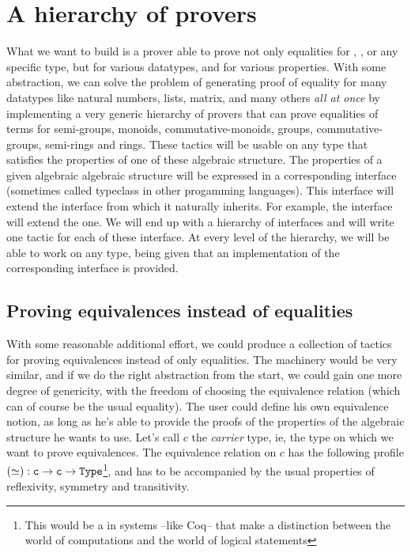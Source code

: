 \section{A hierarchy of provers}

What we want to build is a prover able to prove not only equalities for , , or any specific type, but for various datatypes, and for various properties. With some abstraction, we can solve the problem of generating proof of equality for many datatypes like natural numbers, lists, matrix, and many others \emph{all at once} by implementing a very generic hierarchy of provers that can prove equalities of terms for semi-groups, monoids, commutative-monoids, groups, commutative-groups, semi-rings and rings. These tactics will be usable on any type that satisfies the properties of one of these algebraic structure. The properties of a given algebraic algebraic structure will be expressed in a corresponding interface (sometimes called typeclass in other progamming languages). This interface will extend the interface from which it naturally inherits. For example, the  interface will extend the  one. We will end up with a hierarchy of interfaces and will write one tactic for each of these interface. At every level of the hierarchy, we will be able to work on any type, being given that an implementation of the corresponding interface is provided.

	\subsection{Proving equivalences instead of equalities}
	
With some reasonable additional effort, we could produce a collection of tactics for proving equivalences instead of only equalities. The machinery would be very similar, and if we do the right abstraction from the start, we could gain one more degree of genericity, with the freedom of choosing the equivalence relation (which can of course be the usual equality). The user could define his own equivalence notion, as long as he's able to provide the proofs of the properties of the algebraic structure he wants to use. Let's call $c$ the \emph{carrier} type, ie, the type on which we want to prove equivalences. The equivalence relation on $c$ has the following profile $(\simeq) : {\mbox{\texttt{c}}} \rightarrow {\mbox{\texttt{c}}} \rightarrow {\mbox{\texttt{Type}}}$\footnote{This  would be a  in systems --like Coq-- that make a distinction between the world of computations and the world of logical statements}, and has to be accompanied by the usual properties of reflexivity, symmetry and transitivity.

